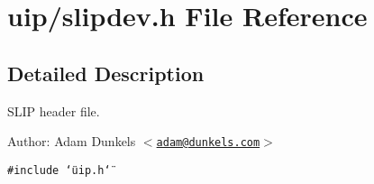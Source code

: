 \hypertarget{a00052}{
\section{uip/slipdev.h File Reference}
\label{a00052}
}


\subsection{Detailed Description}
SLIP header file. 

\begin{Desc}
\item[Author:]Adam Dunkels $<$\href{mailto:adam@dunkels.com}{\tt adam@dunkels.com}$>$ \end{Desc}


{\tt \#include \char`\"{}uip.h\char`\"{}}\par


